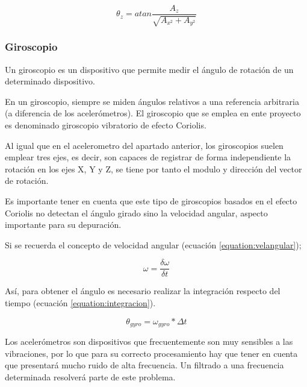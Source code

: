 \begin{equation}
\theta_{z} = atan\frac{A_{z}}{\sqrt{A_{x^2}+A_{y^2}}}
\end{equation}

\subsubsection{Giroscopio}
Un giroscopio es un dispositivo que permite medir el ángulo de rotación de un determinado dispositivo. \newline

En un giroscopio, siempre se miden ángulos relativos a una referencia arbitraria (a diferencia de los acelerómetros). El giroscopio que se emplea en ente proyecto es denominado giroscopio vibratorio de efecto Coriolis. \newline

Al igual que en el acelerometro del apartado anterior, los giroscopios suelen emplear tres ejes, es decir, son capaces de registrar de forma independiente la rotación en los ejes X, Y y Z, se tiene por tanto el modulo y dirección del vector de rotación. \newline

Es importante tener en cuenta que este tipo de giroscopios basados en el efecto Coriolis no detectan el ángulo girado sino la velocidad angular, aspecto importante para su depuración. \newline

Si se recuerda el concepto de velocidad angular (ecuación \ref{equation:velangular});

\begin{equation} \label{equation:velangular}
\omega = \frac{\delta \omega}{\delta t}
\end{equation}

Así, para obtener el ángulo es necesario realizar la integración respecto del tiempo (ecuación \ref{equation:integracion}).

\begin{equation}\label{equation:integracion}
\theta_{gyro} = \omega_{gyro}*\Delta t
\end{equation}

Los acelerómetros son dispositivos que frecuentemente son muy sensibles a las vibraciones, por lo que para su correcto procesamiento hay que tener en cuenta que presentará mucho ruido de alta frecuencia. Un filtrado a una frecuencia determinada resolverá parte de este problema.\newline

